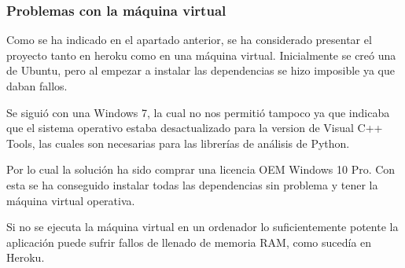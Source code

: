 \subsubsection{Problemas con la máquina virtual}

Como se ha indicado en el apartado anterior, se ha considerado presentar el proyecto tanto en heroku como en una máquina virtual.
Inicialmente se creó una de Ubuntu, pero al empezar a instalar las dependencias se hizo imposible ya que daban fallos.

Se siguió con una Windows 7, la cual no nos permitió tampoco ya que indicaba que el sistema operativo estaba desactualizado para la version de Visual C++ Tools, las cuales son necesarias para las librerías de análisis de Python.

Por lo cual la solución ha sido comprar una licencia OEM Windows 10 Pro. Con esta se ha conseguido instalar todas las dependencias sin problema y tener la máquina virtual operativa.

Si no se ejecuta la máquina virtual en un ordenador lo suficientemente potente la aplicación puede sufrir fallos de llenado de memoria RAM, como sucedía en Heroku.